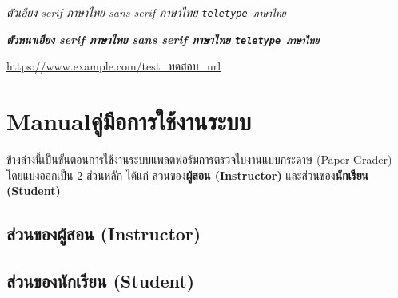 \textit{ตัวเอียง serif ภาษาไทย \textsf{sans serif ภาษาไทย} \texttt{teletype ภาษาไทย}}

\textbf{\textit{ตัวหนาเอียง serif ภาษาไทย \textsf{sans serif ภาษาไทย} \texttt{teletype ภาษาไทย}}}

\url{https://www.example.com/test_ทดสอบ_url}

\chapter{\ifenglish Manual\else คู่มือการใช้งานระบบ\fi}
  \qquad ข้างล่างนี้เป็นขั้นตอนการใช้งานระบบแพลตฟอร์มการตรวจใบงานแบบกระดาษ (Paper Grader) โดยแบ่งออกเป็น 2 ส่วนหลัก
  ได้แก่ ส่วนของ\textbf{ผู้สอน (Instructor)} และส่วนของ\textbf{นักเรียน (Student)}
  
\section{ส่วนของผู้สอน (Instructor)}
\section{ส่วนของนักเรียน (Student)}
